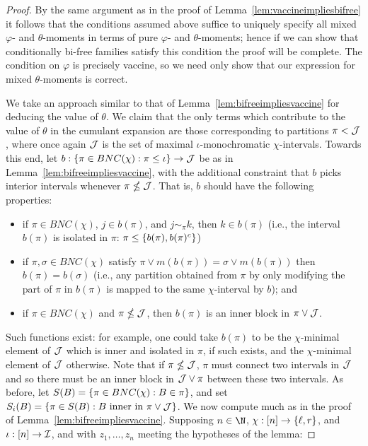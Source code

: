 \begin{proof}
	By the same argument as in the proof of Lemma~\ref{lem:vaccineimpliesbifree} it follows that the conditions assumed above suffice to uniquely specify all mixed $\varphi$- and $\theta$-moments in terms of pure $\varphi$- and $\theta$-moments; hence if we can show that conditionally bi-free families satisfy this condition the proof will be complete.
	The condition on $\varphi$ is precisely vaccine, so we need only show that our expression for mixed $\theta$-moments is correct.

	We take an approach similar to that of Lemma~\ref{lem:bifreeimpliesvaccine} for deducing the value of $\theta$.
	We claim that the only terms which contribute to the value of $\theta$ in the cumulant expansion are those corresponding to partitions $\pi < \mathcal{J}$, where once again $\mathcal{J}$ is the set of maximal $\iota$-monochromatic $\chi$-intervals.
	Towards this end, let $b : \left\{\pi \in BNC(\chi) : \pi \leq \iota\right\} \to \mathcal{J}$ be as in Lemma~\ref{lem:bifreeimpliesvaccine}, with the additional constraint that $b$ picks interior intervals whenever $\pi \nleq \mathcal{J}$.
	That is, $b$ should have the following properties:
	\begin{itemize}
		\item if $\pi \in BNC(\chi)$, $j \in b(\pi)$, and $j \sim_\pi k$, then $k \in b(\pi)$ (i.e., the interval $b(\pi)$ is isolated in $\pi$: $\pi \leq \left\{b(\pi), b(\pi)^c\right\}$)
		\item if $\pi, \sigma \in BNC(\chi)$ satisfy $\pi\vee m(b(\pi)) = \sigma \vee m(b(\pi))$ then $b(\pi) = b(\sigma)$ (i.e., any partition obtained from $\pi$ by only modifying the part of $\pi$ in $b(\pi)$ is mapped to the same $\chi$-interval by $b$); and
		\item if $\pi \in BNC(\chi)$ and $\pi \nleq \mathcal{J}$, then $b(\pi)$ is an inner block in $\pi \vee \mathcal{J}$.
	\end{itemize}
	Such functions exist: for example, one could take $b(\pi)$ to be the $\chi$-minimal element of $\mathcal{J}$ which is inner and isolated in $\pi$, if such exists, and the $\chi$-minimal element of $\mathcal{J}$ otherwise.
	Note that if $\pi \nleq \mathcal{J}$, $\pi$ must connect two intervals in $\mathcal{J}$ and so there must be an inner block in $\mathcal{J}\vee\pi$ between these two intervals.
	As before, let $S(B) = \left\{\pi\in BNC(\chi) : B \in \pi\right\}$, and set $S_i(B) = \left\{\pi\in S(B) : B \text{ inner in } \pi\vee\mathcal{J}\right\}$.
	We now compute much as in the proof of Lemma~\ref{lem:bifreeimpliesvaccine}.
	Supposing $n \in \N$, $\chi : [n] \to \left\{\ell, r\right\}$, and $\iota : [n] \to \mathcal{I}$, and with $z_1, \ldots, z_n$ meeting the hypotheses of the lemma:

\end{proof}
